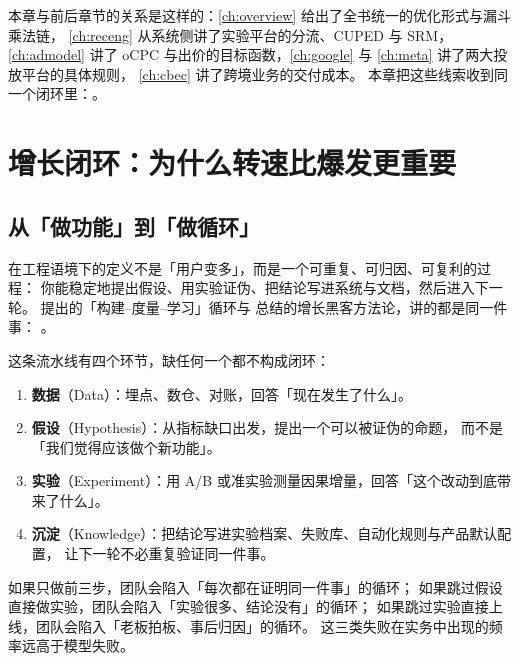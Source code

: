 本章与前后章节的关系是这样的：\cref{ch:overview} 给出了全书统一的优化形式与漏斗乘法链，
\cref{ch:receng} 从系统侧讲了实验平台的分流、CUPED 与 SRM，
\cref{ch:admodel} 讲了 oCPC 与出价的目标函数，\cref{ch:google} 与 \cref{ch:meta} 讲了两大投放平台的具体规则，
\cref{ch:cbec} 讲了跨境业务的交付成本。
本章把这些线索收到同一个闭环里：。

\section{增长闭环：为什么转速比爆发更重要}

\subsection{从「做功能」到「做循环」}

 在工程语境下的定义不是「用户变多」，而是一个可重复、可归因、可复利的过程：
你能稳定地提出假设、用实验证伪、把结论写进系统与文档，然后进入下一轮。
\cite{ries2011lean} 提出的「构建--度量--学习」循环与
\cite{ellis2021growth} 总结的增长黑客方法论，讲的都是同一件事：
。

这条流水线有四个环节，缺任何一个都不构成闭环：

\begin{enumerate}
  \item \textbf{数据}（Data）：埋点、数仓、对账，回答「现在发生了什么」。
  \item \textbf{假设}（Hypothesis）：从指标缺口出发，提出一个可以被证伪的命题，
        而不是「我们觉得应该做个新功能」。
  \item \textbf{实验}（Experiment）：用 A/B 或准实验测量因果增量，回答「这个改动到底带来了什么」。
  \item \textbf{沉淀}（Knowledge）：把结论写进实验档案、失败库、自动化规则与产品默认配置，
        让下一轮不必重复验证同一件事。
\end{enumerate}

如果只做前三步，团队会陷入「每次都在证明同一件事」的循环；
如果跳过假设直接做实验，团队会陷入「实验很多、结论没有」的循环；
如果跳过实验直接上线，团队会陷入「老板拍板、事后归因」的循环。
这三类失败在实务中出现的频率远高于模型失败。


